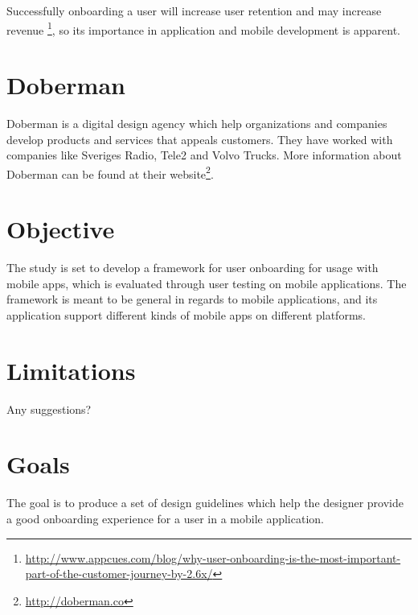 Successfully onboarding a user will increase user retention and may increase revenue \footnote{\url{http://www.appcues.com/blog/why-user-onboarding-is-the-most-important-part-of-the-customer-journey-by-2.6x/}}, so its importance in application and mobile development is apparent.

\section{Doberman}
Doberman is a digital design agency which help organizations and companies develop products and services that appeals customers. They have worked with companies like Sveriges Radio, Tele2 and Volvo Trucks. More information about Doberman can be found at their website\footnote{\url{http://doberman.co}}.

\section{Objective}
The study is set to develop a framework for user onboarding for usage with mobile apps, which is evaluated through user testing on mobile applications. The framework is meant to be general in regards to mobile applications, and its application support different kinds of mobile apps on different platforms.

\section{Limitations}
Any suggestions?

\section{Goals}
The goal is to produce a set of design guidelines which help the designer provide a good onboarding experience for a user in a mobile application.
